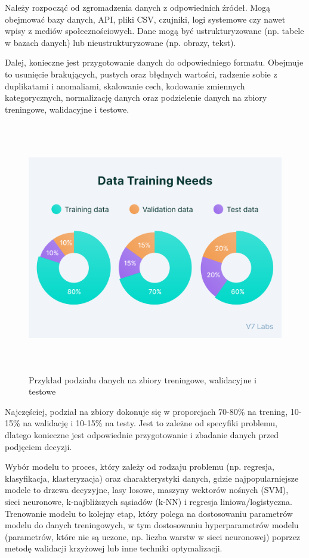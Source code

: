 Należy rozpocząć od zgromadzenia danych z odpowiednich źródeł.
Mogą obejmować bazy danych, API, pliki CSV, czujniki, logi systemowe czy nawet wpisy z mediów społecznościowych.
Dane mogą być ustrukturyzowane (np. tabele w bazach danych) lub nieustrukturyzowane (np. obrazy, tekst).

Dalej, konieczne jest przygotowanie danych do odpowiedniego formatu.
Obejmuje to usunięcie brakujących, pustych oraz błędnych wartości,
radzenie sobie z duplikatami i anomaliami, skalowanie cech, kodowanie zmiennych kategorycznych,
normalizację danych oraz podzielenie danych na zbiory treningowe, walidacyjne i testowe.

\begin{figure}[ht]
	\centering
	\includegraphics[height=11cm]{partials/images/machine_learning_process_1.png} %
	\caption{Przykład podziału danych na zbiory treningowe, walidacyjne i testowe}
\label{Fig:MachineLearningProcess1}
\end{figure}

Najczęściej, podział na zbiory dokonuje się w proporcjach 70-80\% na trening, 10-15\% na walidację i 10-15\% na testy.
Jest to zależne od specyfiki problemu,
dlatego konieczne jest odpowiednie przygotowanie i zbadanie danych przed podjęciem decyzji.

Wybór modelu to proces, który zależy od rodzaju problemu (np. regresja, klasyfikacja, klasteryzacja)
oraz charakterystyki danych, gdzie najpopularniejsze modele to drzewa decyzyjne,
lasy losowe, maszyny wektorów nośnych (SVM), sieci neuronowe, k-najbliższych sąsiadów (k-NN)
i regresja liniowa/logistyczna. Trenowanie modelu to kolejny etap,
który polega na dostosowaniu parametrów modelu do danych treningowych,
w tym dostosowaniu hyperparametrów modelu (parametrów, które nie są uczone,
np. liczba warstw w sieci neuronowej) poprzez metodę walidacji krzyżowej lub inne techniki optymalizacji.

